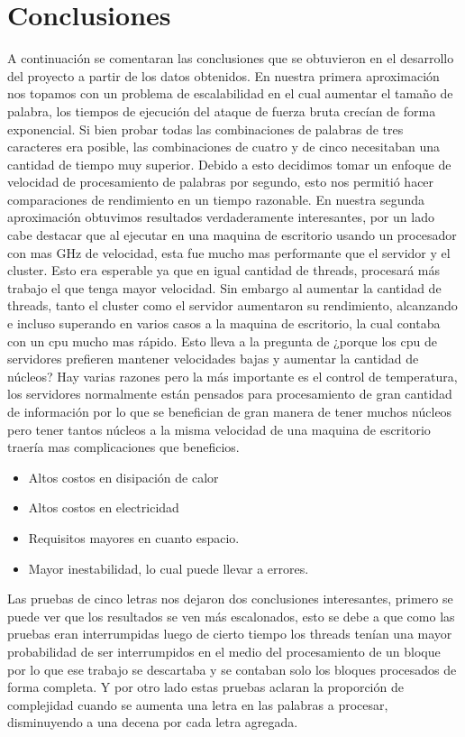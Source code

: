 \documentclass[conference]{IEEEtran}
\begin{document}
\section{Conclusiones}
A continuación se comentaran las conclusiones que se obtuvieron en el desarrollo del proyecto a partir de los datos obtenidos.
En nuestra primera aproximación nos topamos con un problema de escalabilidad en el cual aumentar el tamaño de palabra, los tiempos de ejecución del ataque de fuerza bruta crecían de forma exponencial. Si bien probar todas las combinaciones de palabras de tres caracteres era posible, las combinaciones de cuatro y de cinco necesitaban una cantidad de tiempo muy superior. Debido a esto decidimos tomar un enfoque de velocidad de procesamiento de palabras por segundo, esto nos permitió hacer comparaciones de rendimiento en un tiempo razonable.
En nuestra segunda aproximación obtuvimos resultados verdaderamente interesantes, por un lado cabe destacar que al ejecutar en una maquina de escritorio usando un procesador con mas GHz de velocidad, esta fue mucho mas performante que el servidor y el cluster. Esto era esperable ya que en igual cantidad de threads, procesará más trabajo el que tenga mayor velocidad. Sin embargo al aumentar la cantidad de threads, tanto el cluster como el servidor aumentaron su rendimiento, alcanzando e incluso superando en varios casos a la maquina de escritorio, la cual contaba con un cpu mucho mas rápido. Esto lleva a la pregunta de ¿porque los cpu de servidores prefieren mantener velocidades bajas y aumentar la cantidad de núcleos? Hay varias razones pero la más importante es el control de temperatura, los servidores normalmente están pensados para procesamiento de gran cantidad de información por lo que se benefician de gran manera de tener muchos núcleos pero tener tantos núcleos a la misma velocidad de una maquina de escritorio traería mas complicaciones que beneficios. 
\begin{itemize}
    \item Altos costos en disipación de calor
    \item Altos costos en electricidad
    \item Requisitos mayores en cuanto espacio.
    \item Mayor inestabilidad, lo cual puede llevar a errores.
\end{itemize}
Las pruebas de cinco letras nos dejaron dos conclusiones interesantes, primero se puede ver que los resultados se ven más escalonados, esto se debe a que como las pruebas eran interrumpidas luego de cierto tiempo los threads tenían una mayor probabilidad de ser interrumpidos en el medio del procesamiento de un bloque por lo que ese trabajo se descartaba y se contaban solo los bloques procesados de forma completa. Y por otro lado estas pruebas aclaran la proporción de complejidad cuando se aumenta una letra en las palabras a procesar, disminuyendo a una decena por cada letra agregada.
\end{document}
